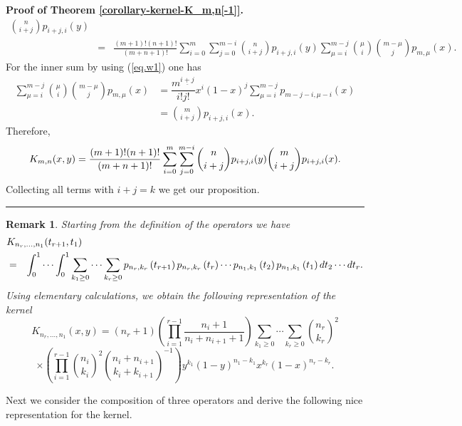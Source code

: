 \documentclass[12pt,reqno]{article}
\newtheorem{remark}[theorem]{Remark}
\newenvironment{proof}[1][Proof]{\noindent\textbf{#1.} }{\ \rule{0.5em}{0.5em}}
\begin{document}
\begin{proof}[{Proof of Theorem \protect\ref{corollary-kernel-K_m,n[-1]}}]
\begin{eqnarray*}
{\binom{n}{i+j}}p_{i+j,i}(y) \\
&=&\frac{(m+1)!(n+1)!}{(m+n+1)!}\sum_{i=0}^{m}\sum_{j=0}^{m-i}{\binom{n}{i+j}%
}p_{i+j,i}(y)\sum_{\mu =i}^{m-j}{\binom{\mu }{i}}{\binom{m-\mu }{j}}p_{m,\mu
}(x).
\end{eqnarray*}%
For the inner sum by using (\ref{eq.w1}) one has 
\begin{align*}
\sum_{\mu =i}^{m-j}{\binom{\mu }{i}}{\binom{m-\mu }{j}}p_{m,\mu }(x)& =%
\dfrac{m^{\underline{i+j}}}{i!j!} x^{i}(1-x)^{j} \sum_{\mu =i}^{m-j}p_{m-j-i,\mu -i}(x)
\\
& ={\binom{m}{i+j}}p_{i+j,i}(x).
\end{align*}%
Therefore, 
\begin{equation*}
K_{m,n}(x,y)=\frac{(m+1)!(n+1)!}{(m+n+1)!}\sum_{i=0}^{m}\sum_{j=0}^{m-i}{%
\binom{n}{i+j}}p_{i+j,i}(y){\binom{m}{i+j}}p_{i+j,i}(x).
\end{equation*}%
Collecting all terms with $i+j=k$ we get our proposition.
\end{proof}

\begin{remark}
Starting from the definition of the operators we have 
\begin{eqnarray*}
\lefteqn{K_{n_{r},\dots ,n_{1}}(t_{r+1},t_{1})} \\
&=&\int_{0}^{1}\cdots \int_{0}^{1}\sum_{k_{1}\geq 0}\cdots \sum_{k_{r}\geq
0}p_{n_{r},k_{r}}\left( t_{r+1}\right) p_{n_{r},k_{r}}\left( t_{r}\right)
\cdots p_{n_{1},k_{1}}\left( t_{2}\right) p_{n_{1},k_{1}}\left( t_{1}\right)
dt_{2}\cdots dt_{r}.
\end{eqnarray*}
Using elementary calculations, we obtain the following representation of the
kernel 
\begin{equation*}
K_{n_{r},\dots ,n_{1}}(x,y)=(n_{r}+1)\left( \prod_{i=1}^{r-1}\dfrac{n_{i}+1}{
n_{i}+n_{i+1}+1}\right) \sum_{k_{1}\geq 0}\cdots \sum_{k_{r}\geq 0}{\binom{
n_{r}}{k_{r}}}^{2}
\end{equation*}
\begin{equation*}
\times \left( \prod_{i=1}^{r-1}{\binom{n_{i}}{k_{i}}}^{2}{\binom{
n_{i}+n_{i+1}}{k_{i}+k_{i+1}}}^{-1}\right)
y^{k_{1}}(1-y)^{n_{1}-k_{1}}x^{k_{r}}(1-x)^{n_{r}-k_{r}}.
\end{equation*}
\end{remark}

Next we consider the composition of three operators and derive the following
nice representation for the kernel.
\end{document}
